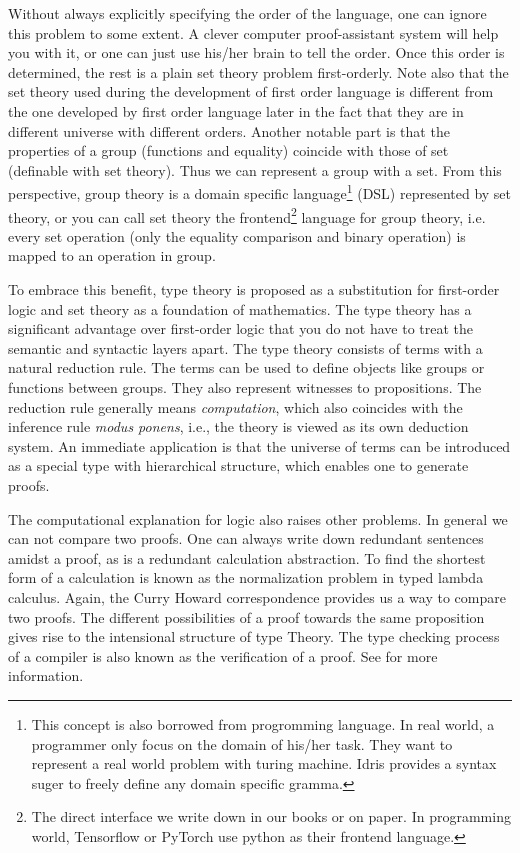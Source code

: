 Without always explicitly specifying the order of the language, one can 
ignore this problem to some extent. A clever computer proof-assistant 
system will help you with it, or one can just use his/her brain to tell 
the order. Once this order is determined, the rest is a plain set theory 
problem first-orderly. Note also that the set theory used during the 
development of first order language is different from the one developed 
by first order language later in the fact that they are in different
universe with different orders. Another notable part is that the
properties of a group (functions and equality) coincide with those of 
set (definable with set theory). Thus we can represent a group with a
set. From this perspective, group theory is a domain specific 
language\footnote{This concept is also borrowed from progromming language.
In real world, a programmer only focus on the domain of his/her task.
They want to represent a real world problem with turing machine. Idris
provides a syntax suger to freely define any domain specific gramma.} 
(DSL) represented by set theory, or you can call set theory the 
frontend\footnote{The direct interface we write down in our books or on 
paper. In programming world, Tensorflow or PyTorch use python as their 
frontend language.} language for group theory, i.e. every set operation 
(only the equality comparison and binary operation) is mapped to an 
operation in group. 

To embrace this benefit, type theory is proposed as a substitution for
first-order logic and set theory as a foundation of mathematics. 
The type theory has a significant advantage over first-order 
logic that you do not have to treat the semantic and syntactic layers
apart. The type theory consists of terms with a natural reduction rule. 
The terms can be used to define objects like groups or functions between
groups. They also represent witnesses to propositions. The reduction rule
generally means {\it computation}, which also coincides with the inference
rule {\it modus ponens}, i.e., the theory is viewed as its own deduction 
system. An immediate application is that the universe of terms can be 
introduced as a special type with hierarchical structure, which enables
one to generate proofs. 

The computational explanation for logic also raises other problems.
In general we can not compare two proofs. One can always write down
redundant sentences amidst a proof, as is a redundant calculation
abstraction. To find the shortest form of a calculation is known as
the normalization problem in typed lambda calculus\cite{Curry-Howard}.
Again, the Curry Howard correspondence provides us a way to compare two
proofs. The different possibilities of a proof towards the same 
proposition gives rise to the intensional structure of type Theory. 
The type checking process of a compiler is also known as the verification
of a proof. See \cite{Curry-Howard} for more information. 


